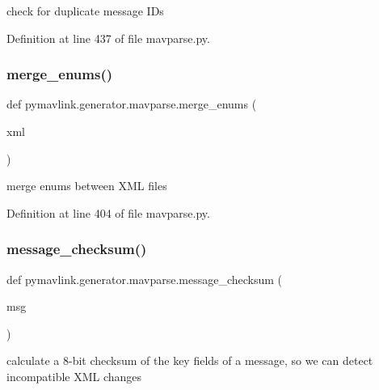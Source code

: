 \begin{DoxyVerb}check for duplicate message IDs\end{DoxyVerb}
 

Definition at line 437 of file mavparse.\+py.

\mbox{\label{namespacepymavlink_1_1generator_1_1mavparse_a7547b5a23ef0b60fac86a3dae099723b}} 
\subsubsection{\texorpdfstring{merge\_enums()}{merge\_enums()}}
{\footnotesize\ttfamily def pymavlink.\+generator.\+mavparse.\+merge\+\_\+enums (\begin{DoxyParamCaption}\item[{}]{xml }\end{DoxyParamCaption})}

\begin{DoxyVerb}merge enums between XML files\end{DoxyVerb}
 

Definition at line 404 of file mavparse.\+py.

\mbox{\label{namespacepymavlink_1_1generator_1_1mavparse_aba7d09994f850b5dce98eb0356318543}} 
\subsubsection{\texorpdfstring{message\_checksum()}{message\_checksum()}}
{\footnotesize\ttfamily def pymavlink.\+generator.\+mavparse.\+message\+\_\+checksum (\begin{DoxyParamCaption}\item[{}]{msg }\end{DoxyParamCaption})}

\begin{DoxyVerb}calculate a 8-bit checksum of the key fields of a message, so we
   can detect incompatible XML changes\end{DoxyVerb}
 

